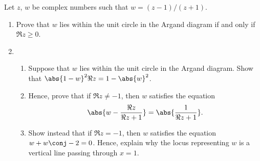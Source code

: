 \begin{problem}
    Let $z$, $w$ be complex numbers such that $w = (z-1)/(z+1)$.

    \begin{enumerate}
        \item Prove that $w$ lies within the unit circle in the Argand diagram if and only if $\Re z \geq 0$.
        \item \begin{enumerate}
            \item Suppose that $w$ lies within the unit circle in the Argand diagram. Show that $\abs{1 - w}^2 \Re z = 1- \abs{w}^2$.
            \item Hence, prove that if $\Re z \neq -1$, then $w$ satisfies the equation \[\abs{w - \frac{\Re z}{\Re z + 1}} = \abs{\frac1{\Re z + 1}}.\]
            \item Show instead that if $\Re z = -1$, then $w$ satisfies the equation $w + w\conj -2 = 0$. Hence, explain why the locus representing $w$ is a vertical line passing through $x = 1$.
        \end{enumerate}
    \end{enumerate}
\end{problem}
